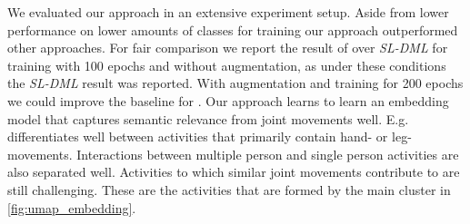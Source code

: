 We evaluated our approach in an extensive experiment setup. Aside from lower performance on lower amounts of classes for training our approach outperformed other approaches. For fair comparison we report the result of \skeletondmlimpro{} over \textit{SL-DML} for training with 100 epochs and without augmentation, as under these conditions the \textit{SL-DML} result was reported. With augmentation and training for 200 epochs we could improve the baseline for \skeletondmlaugmentedimprosldml. Our approach learns to learn an embedding model that captures semantic relevance from joint movements well. E.g. \approachname{} differentiates well between activities that primarily contain hand- or leg-movements. Interactions between multiple person and single person activities are also separated well. Activities to which similar joint movements contribute to are still challenging. These are the activities that are formed by the main cluster in \figname \ref{fig:umap_embedding}.